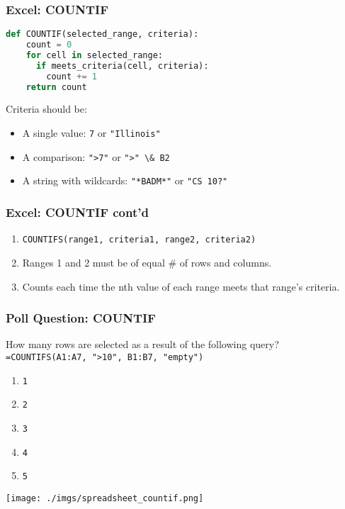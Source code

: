 \documentclass{beamer}
\begin{document}
%
%
\begin{frame}[fragile]
  \frametitle{Excel: COUNTIF}
  \begin{lstlisting}[language=Python, autogobble]
  def COUNTIF(selected_range, criteria):
    count = 0
    for cell in selected_range:
      if meets_criteria(cell, criteria):
        count += 1
    return count
  \end{lstlisting}
  \vfill
  Criteria should be:
  \begin{itemize}
    \item A single value: \lstinline|7| or \lstinline|"Illinois"|
    \item A comparison: \lstinline|">7"| or \lstinline|">" \& B2|
    \item A string with wildcards: \lstinline|"*BADM*"| or \lstinline|"CS 10?"|
  \end{itemize}
\end{frame}


%
%
%
\begin{frame}[fragile]
  \frametitle{Excel: COUNTIF cont'd}
  \begin{enumerate}[A]
    \item \lstinline|COUNTIFS(range1, criteria1, range2, criteria2)|
    \item Ranges 1 and 2 must be of equal \# of rows and columns.
    \item Counts each time the nth value of each range meets that range's criteria.
  \end{enumerate}
\end{frame}

%
%
%
\begin{frame}[fragile]
  \frametitle{Poll Question: COUNTIF}
  How many rows are selected as a result of the following query?
  \lstinline|=COUNTIFS(A1:A7, ">10", B1:B7, "empty")|
  \vfill
  \begin{minipage}{0.48\textwidth}
  \begin{enumerate}[A]
    \item \lstinline|1|
    \item \lstinline|2|
    \item \lstinline|3|
    \item \lstinline|4|
    \item \lstinline|5|
  \end{enumerate}
  \end{minipage}
  \hfill
  \begin{minipage}{0.48\textwidth}
    \texttt{[image: ./imgs/spreadsheet\_countif.png]}
  \end{minipage}
\end{frame}
\end{document}
